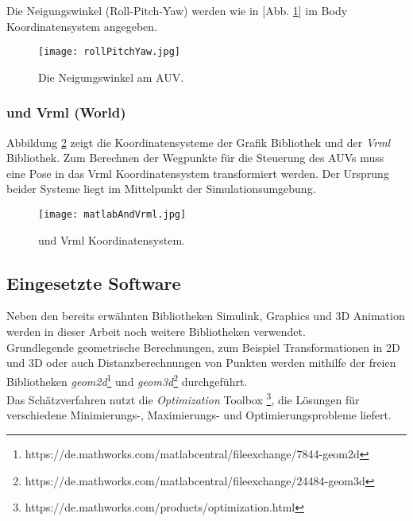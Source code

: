 Die Neigungswinkel (Roll-Pitch-Yaw) werden wie in [Abb. \ref{Abb. 2}] im Body Koordinatensystem angegeben.
\begin{figure}[H]
	\centering
	\texttt{[image: rollPitchYaw.jpg]}
	\caption{Die Neigungswinkel am AUV.}
	\label{Abb. 2}
\end{figure}
\subsubsection{\matlab und Vrml (World)}
Abbildung \ref{Abb. 3} zeigt die Koordinatensysteme der \matlab Grafik Bibliothek und der \textit{Vrml} Bibliothek. Zum Berechnen der Wegpunkte für die Steuerung des AUVs muss eine Pose in das Vrml Koordinatensystem transformiert werden. Der Ursprung beider Systeme liegt im Mittelpunkt der Simulationsumgebung.
\begin{figure}[H]
	\centering
	\texttt{[image: matlabAndVrml.jpg]}
	\caption{\matlab und Vrml Koordinatensystem.}
	\label{Abb. 3}
\end{figure}

\subsection{Eingesetzte Software}
Neben den bereits erwähnten \matlab Bibliotheken Simulink, Graphics und 3D Animation werden in dieser Arbeit noch weitere Bibliotheken verwendet.\\
Grundlegende geometrische Berechnungen, zum Beispiel Transformationen in 2D und 3D oder auch Distanzberechnungen von Punkten werden mithilfe der freien Bibliotheken \textit{geom2d}\footnote{https://de.mathworks.com/matlabcentral/fileexchange/7844-geom2d} und \textit{geom3d}\footnote{https://de.mathworks.com/matlabcentral/fileexchange/24484-geom3d} durchgeführt.\\
Das Schätzverfahren nutzt die \textit{Optimization} Toolbox \footnote{https://de.mathworks.com/products/optimization.html}, die Lösungen für verschiedene Minimierungs-, Maximierungs- und Optimierungsprobleme liefert. 